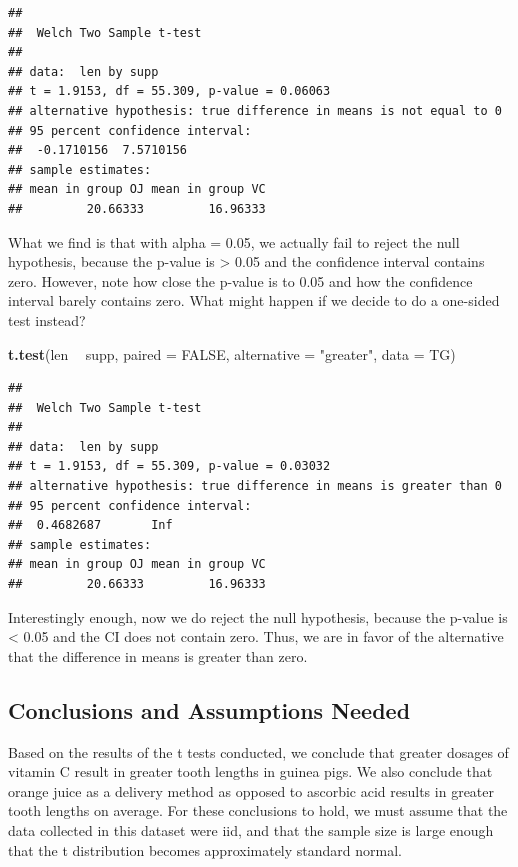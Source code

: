 \documentclass[
]{article}
\newenvironment{Shaded}{\begin{snugshade}}{\end{snugshade}}
\newcommand{\DataTypeTok}[1]{\textcolor[rgb]{0.13,0.29,0.53}{#1}}
\newcommand{\KeywordTok}[1]{\textcolor[rgb]{0.13,0.29,0.53}{\textbf{#1}}}
\newcommand{\NormalTok}[1]{#1}
\newcommand{\OperatorTok}[1]{\textcolor[rgb]{0.81,0.36,0.00}{\textbf{#1}}}
\newcommand{\OtherTok}[1]{\textcolor[rgb]{0.56,0.35,0.01}{#1}}
\newcommand{\StringTok}[1]{\textcolor[rgb]{0.31,0.60,0.02}{#1}}
\begin{document}
\begin{verbatim}
## 
##  Welch Two Sample t-test
## 
## data:  len by supp
## t = 1.9153, df = 55.309, p-value = 0.06063
## alternative hypothesis: true difference in means is not equal to 0
## 95 percent confidence interval:
##  -0.1710156  7.5710156
## sample estimates:
## mean in group OJ mean in group VC 
##         20.66333         16.96333
\end{verbatim}

What we find is that with alpha = 0.05, we actually fail to reject the
null hypothesis, because the p-value is \textgreater{} 0.05 and the
confidence interval contains zero. However, note how close the p-value
is to 0.05 and how the confidence interval barely contains zero. What
might happen if we decide to do a one-sided test instead?

\begin{Shaded}
\begin{Highlighting}[]
\KeywordTok{t.test}\NormalTok{(len }\OperatorTok{~}\StringTok{ }\NormalTok{supp, }\DataTypeTok{paired =} \OtherTok{FALSE}\NormalTok{, }\DataTypeTok{alternative =} \StringTok{"greater"}\NormalTok{, }\DataTypeTok{data =}\NormalTok{ TG)}
\end{Highlighting}
\end{Shaded}

\begin{verbatim}
## 
##  Welch Two Sample t-test
## 
## data:  len by supp
## t = 1.9153, df = 55.309, p-value = 0.03032
## alternative hypothesis: true difference in means is greater than 0
## 95 percent confidence interval:
##  0.4682687       Inf
## sample estimates:
## mean in group OJ mean in group VC 
##         20.66333         16.96333
\end{verbatim}

Interestingly enough, now we do reject the null hypothesis, because the
p-value is \textless{} 0.05 and the CI does not contain zero. Thus, we
are in favor of the alternative that the difference in means is greater
than zero.

\hypertarget{conclusions-and-assumptions-needed}{%
\subsection{Conclusions and Assumptions
Needed}\label{conclusions-and-assumptions-needed}}

Based on the results of the t tests conducted, we conclude that greater
dosages of vitamin C result in greater tooth lengths in guinea pigs. We
also conclude that orange juice as a delivery method as opposed to
ascorbic acid results in greater tooth lengths on average. For these
conclusions to hold, we must assume that the data collected in this
dataset were iid, and that the sample size is large enough that the t
distribution becomes approximately standard normal.
\end{document}
